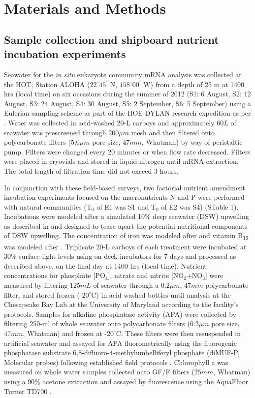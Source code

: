 \section{Materials and Methods}

\subsection{Sample collection and shipboard nutrient incubation experiments}
Seawater for the \textit{in situ} eukaryote community mRNA analysis was collected at the HOT, Station ALOHA ($22^\circ 45^\prime$ N, $158^\circ 00^\prime$ W) from a depth of 25 m at 1400 hrs (local time) on six occasions during the summer of 2012 (S1: 6 August, S2: 12 August, S3: 24 August, S4: 30 August, S5: 2 September, S6: 5 September) using a Eulerian sampling scheme as part of the HOE-DYLAN research expedition as per \citet{Alexander2015a}. Water was collected in acid-washed 20-L carboys and approximately $60 L$ of seawater was prescreened through $200 \mu m$ mesh and then filtered onto polycarbonate filters ($5.0 \mu m$ pore size, $47 mm$, Whatman) by way of peristaltic pump. Filters were changed every 20 minutes or when flow rate decreased. Filters were placed in cryovials and stored in liquid nitrogen until mRNA extraction. The total length of filtration time did not exceed 3 hours. \par

In conjunction with these field-based surveys, two factorial nutrient amendment incubation experiments focused on the macronutrients N and P were performed with natural communities (T$_0$ of E1 was S1 and T$_0$ of E2 was S4) (STable 1). Incubations were modeled after a simulated 10\% deep seawater (DSW) upwelling as described in \citet{Alexander2015a} and designed to tease apart the potential nutritional components of DSW upwelling. The concentration of iron was modeled after \citet{Marchetti2012a} and vitamin B\textsubscript{12} was modeled after \citet{Bertrand2007}. Triplicate 20-L carboys of each treatment were incubated at 30\% surface light-levels using on-deck incubators for 7 days and processed as described above, on the final day at 1400 hrs (local time). Nutrient concentrations for phosphate [PO$_{4}$], nitrate and nitrite [NO$_2$+NO$_3$] were measured by filtering $125 mL$ of seawater through a $0.2 \mu m$, $47 mm$ polycarbonate filter, and stored frozen (-$20^\circ$C) in acid washed bottles until analysis at the Chesapeake Bay Lab at the University of Maryland according to the facility's protocols. Samples for alkaline phosphatase activity (APA) were collected by filtering 250-ml of whole seawater onto polycarbonate filters ($0.2 \mu m$ pore size, $47 mm$, Whatman) and frozen at -$20^\circ$C. These filters were then resuspended in artificial seawater and assayed for APA fluorometrically using the fluorogenic phosphatase substrate 6,8-difluoro-4-methylumbelliferyl phosphate (diMUF-P, Molecular probes) following established field protocols \citep{Dyhrman2006}. Chlorophyll a was measured on whole water samples collected onto GF/F filters ($25 mm$, Whatman) using a 90\% acetone extraction and assayed by fluorescence using the AquaFluor Turner TD700 \citep{Parsons1984}.\par

